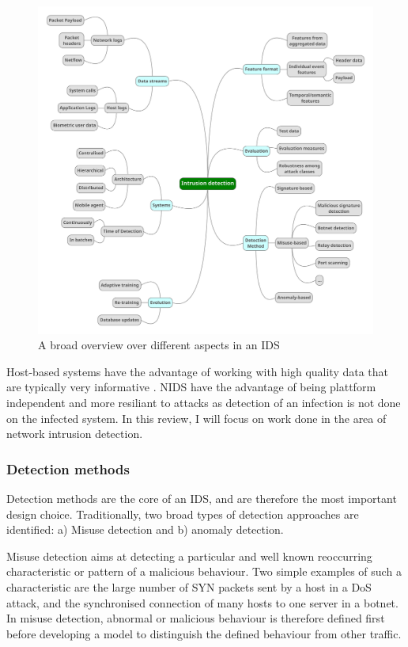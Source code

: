 \documentclass[a4paper,12pt,twoside]{article}
\begin{document}
\begin{figure}\label{graph}
\centering
\includegraphics[scale=0.25]{images/Graphic2.pdf}
\caption{A broad overview over different aspects in an IDS}
\end{figure}

Host-based systems have the advantage of working with high quality data that   are   typically   very   informative \cite{lazarevic2005intrusion}. NIDS have the advantage of being plattform independent and more resiliant to attacks as detection of an infection is not done on the infected system. In this review, I will focus on work done in the area of network intrusion detection.


\subsubsection*{Detection methods}

Detection methods are the core of an IDS, and are therefore the most important design choice. Traditionally, two broad types of detection approaches are identified: a) Misuse detection and b) anomaly detection. 

Misuse detection aims at detecting a particular and well known reoccurring characteristic or pattern of a malicious behaviour. Two simple examples of such a characteristic are the large number of SYN packets sent by a host in a DoS attack, and the synchronised connection of many hosts to one server in a botnet. In misuse detection, abnormal or malicious behaviour is therefore defined first before developing a model to distinguish the defined behaviour from other traffic.
\end{document}
